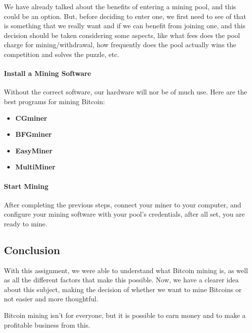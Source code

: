 \documentclass{article}
\newcommand\tab[1][1cm]{\hspace*{#1}}
\begin{document}
\tab We have already talked about the benefits of entering a mining pool, and this could be an option. But, before deciding to enter one, we first need to see of that is something that we really want and if we can benefit from joining one, and this decision should be taken considering some aspects, like what fees does the pool charge for mining/withdrawal, how frequently does the pool actually wins the competition and solves the puzzle, etc.

\paragraph{Install a Mining Software}

\tab Without the correct software, our hardware will nor be of much use. Here are the best programs for mining Bitcoin:

\begin{itemize}
    \item \textbf{CGminer}
    \item \textbf{BFGminer}
    \item \textbf{EasyMiner}
    \item \textbf{MultiMiner}
\end{itemize}
 
\paragraph{Start Mining}
 
\tab After completing the previous steps, connect your miner to your computer, and configure your mining software with your pool's credentials, after all set, you are ready to mine.

\subsection{Conclusion}

\tab With this assignment, we were able to understand what Bitcoin mining is, as well as all the different factors that make this possible. Now, we have a clearer idea about this subject, making the decision of whether we want to mine Bitcoins or not easier and more thoughtful.

Bitcoin mining isn't for everyone, but it is possible to earn money and to make a profitable business from this.

\newpage

\nocite{*}
\printbibliography
\end{document}
